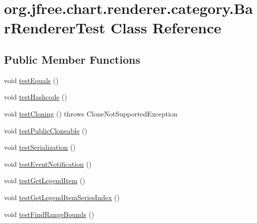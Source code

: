 \hypertarget{classorg_1_1jfree_1_1chart_1_1renderer_1_1category_1_1_bar_renderer_test}{}\section{org.\+jfree.\+chart.\+renderer.\+category.\+Bar\+Renderer\+Test Class Reference}
\label{classorg_1_1jfree_1_1chart_1_1renderer_1_1category_1_1_bar_renderer_test}
\subsection*{Public Member Functions}
\begin{DoxyCompactItemize}
\item 
void \mbox{\hyperlink{classorg_1_1jfree_1_1chart_1_1renderer_1_1category_1_1_bar_renderer_test_adfeae36d3a25cf0d780819b2af5943c3}{test\+Equals}} ()
\item 
void \mbox{\hyperlink{classorg_1_1jfree_1_1chart_1_1renderer_1_1category_1_1_bar_renderer_test_abb4dab432878b257065664f5d117e31c}{test\+Hashcode}} ()
\item 
void \mbox{\hyperlink{classorg_1_1jfree_1_1chart_1_1renderer_1_1category_1_1_bar_renderer_test_a162fb5e580e3d7e525a6d2d598e2e164}{test\+Cloning}} ()  throws Clone\+Not\+Supported\+Exception 
\item 
void \mbox{\hyperlink{classorg_1_1jfree_1_1chart_1_1renderer_1_1category_1_1_bar_renderer_test_aab86199516dc7b3a9679ab77f55cc264}{test\+Public\+Cloneable}} ()
\item 
void \mbox{\hyperlink{classorg_1_1jfree_1_1chart_1_1renderer_1_1category_1_1_bar_renderer_test_a8f866f0b83e7359bd3fd6a3b5ea68bb9}{test\+Serialization}} ()
\item 
void \mbox{\hyperlink{classorg_1_1jfree_1_1chart_1_1renderer_1_1category_1_1_bar_renderer_test_a81ab1128acf3b0984feae1d01d0aed36}{test\+Event\+Notification}} ()
\item 
void \mbox{\hyperlink{classorg_1_1jfree_1_1chart_1_1renderer_1_1category_1_1_bar_renderer_test_a1ba086d122ce3618c0ceaf83be07dacb}{test\+Get\+Legend\+Item}} ()
\item 
void \mbox{\hyperlink{classorg_1_1jfree_1_1chart_1_1renderer_1_1category_1_1_bar_renderer_test_aceff4c2664e7c02a18173fe1ec220778}{test\+Get\+Legend\+Item\+Series\+Index}} ()
\item 
void \mbox{\hyperlink{classorg_1_1jfree_1_1chart_1_1renderer_1_1category_1_1_bar_renderer_test_ad8f15b4ee55547c60386f53040429963}{test\+Find\+Range\+Bounds}} ()
\end{DoxyCompactItemize}


